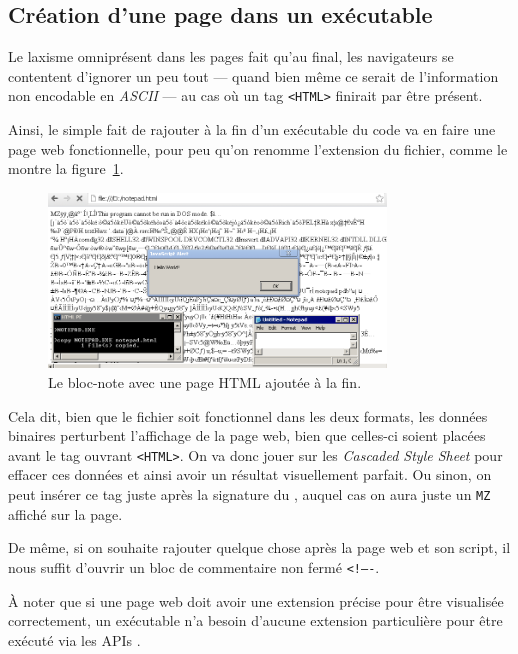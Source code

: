 \subsection{Création d'une page \HTML dans un exécutable}

Le laxisme omniprésent dans les pages \HTML fait qu'au final, les navigateurs se contentent d'ignorer un peu tout --- quand bien même ce serait de l'information non encodable en \emph{ASCII} --- au cas où un tag \texttt{<HTML>} finirait par être présent.

Ainsi, le simple fait de rajouter à la fin d'un exécutable du code \HTML va en faire une page web fonctionnelle, pour peu qu'on renomme l'extension du fichier, comme le montre la figure~\ref{fig:albertini:htmlnotepad}.

\begin{figure}[ht]
  \centering
  \includegraphics[width=0.8\textwidth]{albertini/img/htmlnotepad}
  \caption{Le bloc-note \WIN avec une page HTML ajoutée à la fin.}
  \label{fig:albertini:htmlnotepad}
\end{figure}

Cela dit, bien que le fichier soit fonctionnel dans les deux formats, les données binaires perturbent l'affichage de la page web, bien que celles-ci soient placées avant le tag ouvrant \texttt{<HTML>}.
On va donc jouer sur les \emph{Cascaded Style Sheet} pour effacer ces données et ainsi avoir un résultat visuellement parfait. Ou sinon, on peut insérer ce tag juste après la signature du \PE, auquel cas on aura juste un \texttt{MZ} affiché sur la page.

De même, si on souhaite rajouter quelque chose après la page web et son script, il nous suffit d'ouvrir un bloc de commentaire non fermé \texttt{<!----}.

À noter que si une page web doit avoir une extension précise pour être visualisée correctement, un exécutable \WIN n'a besoin d'aucune extension particulière pour être exécuté via les APIs \WIN.

